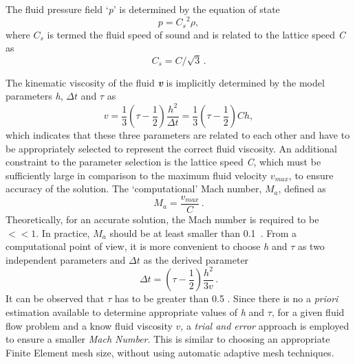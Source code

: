The fluid pressure field `\textit{p}' is determined by the 
equation of state
%
\begin{equation}
	\mathit{p}=\mathit{C_s}^{2} \rho,
\end{equation}
%
\noindent where $\mathit{C_s}$ is termed the fluid speed of sound and is 
related to the lattice speed \textit{C} as
%
\begin{equation}
	\mathit{C_s}=\mathit{C}/\sqrt{3}\,.
\end{equation}

The kinematic viscosity of the fluid \textbf{\textit{v}} is implicitly 
determined by the model parameters \textit{h}, $\Delta \mathit{t}$ and $\tau$ 
as
%
\begin{equation}
	\mathit{v}=\frac{1}{3}(\tau - \frac{1}{2})\frac{\mathit{h}^{2}}{\Delta 
	\mathit{t}} = \frac{1}{3}(\tau - \frac{1}{2})\mathit{Ch},
\end{equation}
%
\noindent which indicates that these three parameters are related to each other 
and have to be appropriately selected to represent the correct fluid viscosity. 
An additional constraint to the parameter selection is the lattice speed 
\textit{C}, which must be sufficiently large in comparison to the maximum 
fluid velocity $\mathit{v}_{\mathit{max}}$, to ensure 
accuracy of the solution. The `computational' Mach number, 
$\mathit{M}_{\mathit{a}}$, defined as
%
\begin{equation}
	\mathit{M}_{\mathit{a}}=\frac{\mathit{v}_{\mathit{max}}}{\mathit{C}}\,.
\end{equation}
%
Theoretically, for an accurate solution, the Mach number is required to be $<< 
1$. In practice, $\mathit{M}_{\mathit{a}}$ should be at least smaller than 
0.1~\citep{He1997}. 
From a computational point of view, it is more convenient to choose \textit{h} 
and $\tau$ as two independent parameters and $\Delta \mathit{t}$ as the derived 
parameter
%
\begin{equation}
	\Delta \mathit{t} = (\tau - \frac{1}{2}) \frac{h^{2}}{3\mathit{v}}\,.
\end{equation}
%
It can be observed that $\tau$ has to be greater than 0.5 \citep{He1997}. 
Since there is no a \emph{priori} estimation available to determine appropriate 
values 
of \textit{h} and $\tau$, for a given fluid flow problem and a know fluid 
viscosity $\mathit{v}$, a \textit{trial and error} approach is employed to 
ensure a smaller \textit{Mach Number}. This is similar to choosing an 
appropriate Finite Element mesh size, without using automatic adaptive mesh 
techniques. 

